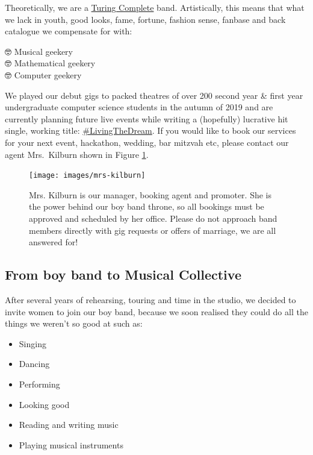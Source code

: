\documentclass[
  12pt,
]{book}
\providecommand{\tightlist}{%
  \setlength{\itemsep}{0pt}\setlength{\parskip}{0pt}}
\begin{document}
Theoretically, we are a \href{https://en.wikipedia.org/wiki/Turing_completeness}{Turing Complete} band. \citep{Turing1937, turingcomplete} Artistically, this means that what we lack in youth, good looks, fame, fortune, fashion sense, fanbase and back catalogue we compensate for with:

🤓 Musical geekery \citep{musicnmaths, behindthemusic}\\
🤓 Mathematical geekery \citep{plusmaths}\\
🤓 Computer geekery \citep{Aaron2016}

We played our debut gigs to packed theatres of over 200 second year \& first year undergraduate computer science students in the autumn of 2019 and are currently planning future live events while writing a (hopefully) lucrative hit single, working title: \href{https://twitter.com/hashtag/LivingTheDream}{\#LivingTheDream}. If you would like to book our services for your next event, hackathon, wedding, bar mitzvah etc, please contact our agent Mrs.~Kilburn shown in Figure \ref{fig:mrskilburn-fig}.

\begin{figure}

{\centering \texttt{[image: images/mrs-kilburn]} 

}

\caption{Mrs. Kilburn is our manager, booking agent and promoter. She is the power behind our boy band throne, so all bookings must be approved and scheduled by her office. Please do not approach band members directly with gig requests or offers of marriage, we are all answered for!}\label{fig:mrskilburn-fig}
\end{figure}

\hypertarget{collective}{%
\subsection{From boy band to Musical Collective}\label{collective}}

After several years of rehearsing, touring and time in the studio, we decided to invite women to join our boy band, because we soon realised they could do all the things we weren't so good at such as:

\begin{itemize}
\tightlist
\item
  Singing
\item
  Dancing
\item
  Performing
\item
  Looking good
\item
  Reading and writing music
\item
  Playing musical instruments
\end{itemize}
\end{document}
